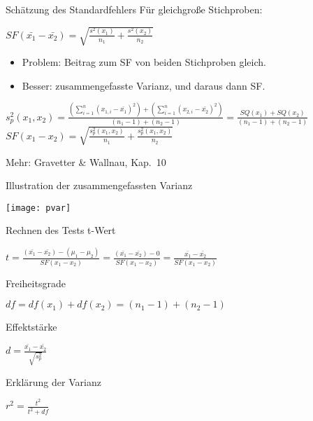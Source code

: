 \begin{frame}
  {Schätzung des Standardfehlers}
  Für \alert{gleichgroße Stichproben}:
  \begin{center}
    \alert{$SF(\bar{x_1}-\bar{x_2})=\sqrt{\frac{s^2(x_1)}{n_1}+\frac{s^2(x_2)}{n_2}}$}
  \end{center}
  \pause
  \begin{itemize}[<+->]
    \item Problem: Beitrag zum SF von beiden Stichproben gleich.
    \item Besser: \alert{zusammengefasste Varianz}, und daraus dann SF.
  \end{itemize}
  \pause
  \begin{center}
    \alert{$s^2_p(x_1,x_2)=\frac{(\sum\limits_{i=1}^{n}(x_{1,i}-\bar{x_1})^2)+(\sum\limits_{i=1}^{n}(x_{2,i}-\bar{x_2})^2)}{(n_1-1)+(n_2-1)}=\frac{SQ(x_1)+SQ(x_2)}{(n_1-1)+(n_2-1)}$}\\
    \vspace{0.5cm}
    \pause
    \alert{$SF(x_1-x_2)=\sqrt{\frac{s^2_p(x_1,x_2)}{n_1}+\frac{s^2_p(x_1,x_2)}{n_2}}$}
  \end{center}
  \pause
  \footnotesize
  Mehr: Gravetter \& Wallnau, Kap.\ 10
\end{frame}

\begin{frame}
  {Illustration der zusammengefassten Varianz}
  \begin{center}
    \texttt{[image: pvar]}
  \end{center}
\end{frame}


\begin{frame}
  {Rechnen des Tests}
  t-Wert
  \begin{center}
    \alert{$t=$}$\frac{(\bar{x_1}-\bar{x_2})-(\mu_1-\mu_2)}{SF(x_1-x_2)}=\frac{(\bar{x_1}-\bar{x_2})-0}{SF(x_1-x_2)}=$\alert{$\frac{\bar{x_1}-\bar{x_2}}{SF(x_1-x_2)}$}
  \end{center}
  \pause
  Freiheitsgrade
  \begin{center}
    $df=df(x_1)+df(x_2)=(n_1-1)+(n_2-1)$
  \end{center}
  \pause
  Effektstärke
  \begin{center}
    $d=\frac{\bar{x_1}-\bar{x_2}}{\sqrt{s^2_p}}$
  \end{center}
  \pause
  Erklärung der Varianz
  \begin{center}
    $r^2=\frac{t^2}{t^2+df}$
  \end{center}
\end{frame}

